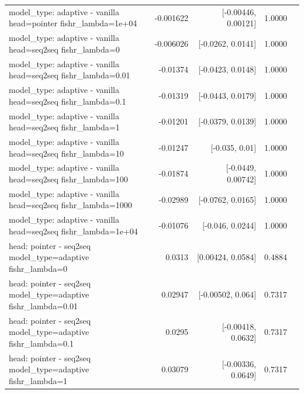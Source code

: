 \documentclass[10pt]{article}
\makeatletter
\newcommand{\stackcell}[1]{\begin{tabular}[t]{@{}l@{}}#1\end{tabular}}
\makeatother
\begin{document}
{\begin{longtable}{lrrrl}
\stackcell{model\_type: adaptive - vanilla\\\footnotesize head=pointer fishr\_lambda=1e+04 } & -0.001622 & [-0.00446, 0.00121] & 1.0000 & \\
\stackcell{model\_type: adaptive - vanilla\\\footnotesize head=seq2seq fishr\_lambda=0 } & -0.006026 & [-0.0262, 0.0141] & 1.0000 & \\
\stackcell{model\_type: adaptive - vanilla\\\footnotesize head=seq2seq fishr\_lambda=0.01 } & -0.01374 & [-0.0423, 0.0148] & 1.0000 & \\
\stackcell{model\_type: adaptive - vanilla\\\footnotesize head=seq2seq fishr\_lambda=0.1 } & -0.01319 & [-0.0443, 0.0179] & 1.0000 & \\
\stackcell{model\_type: adaptive - vanilla\\\footnotesize head=seq2seq fishr\_lambda=1 } & -0.01201 & [-0.0379, 0.0139] & 1.0000 & \\
\stackcell{model\_type: adaptive - vanilla\\\footnotesize head=seq2seq fishr\_lambda=10 } & -0.01247 & [-0.035, 0.01] & 1.0000 & \\
\stackcell{model\_type: adaptive - vanilla\\\footnotesize head=seq2seq fishr\_lambda=100 } & -0.01874 & [-0.0449, 0.00742] & 1.0000 & \\
\stackcell{model\_type: adaptive - vanilla\\\footnotesize head=seq2seq fishr\_lambda=1000 } & -0.02989 & [-0.0762, 0.0165] & 1.0000 & \\
\stackcell{model\_type: adaptive - vanilla\\\footnotesize head=seq2seq fishr\_lambda=1e+04 } & -0.01076 & [-0.046, 0.0244] & 1.0000 & \\
\stackcell{head: pointer - seq2seq\\\footnotesize model\_type=adaptive fishr\_lambda=0 } & 0.0313 & [0.00424, 0.0584] & 0.4884 & \\
\stackcell{head: pointer - seq2seq\\\footnotesize model\_type=adaptive fishr\_lambda=0.01 } & 0.02947 & [-0.00502, 0.064] & 0.7317 & \\
\stackcell{head: pointer - seq2seq\\\footnotesize model\_type=adaptive fishr\_lambda=0.1 } & 0.0295 & [-0.00418, 0.0632] & 0.7317 & \\
\stackcell{head: pointer - seq2seq\\\footnotesize model\_type=adaptive fishr\_lambda=1 } & 0.03079 & [-0.00336, 0.0649] & 0.7317 & \\

\end{longtable}}
\end{document}
